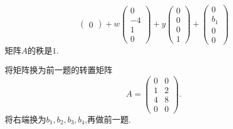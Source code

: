 ﻿\documentclass{book} \usepackage{exsheets} \usepackage{xeCJK}
\begin{document}
\begin{solution}
$$\begin{pmatrix}
  0
\end{pmatrix}+w
\begin{pmatrix}
  0\\
  -4\\
  1\\
  0
\end{pmatrix}+y
\begin{pmatrix}
  0\\
  0\\
  0\\
  1
\end{pmatrix}+
\begin{pmatrix}
  0\\
  b_1\\
  0\\
  0
\end{pmatrix}
$$矩阵$A$的秩是$1$.
\end{solution}
\begin{question}
  将矩阵换为前一题的转置矩阵
$$
A=
\begin{pmatrix}
  0&0\\
  1&2\\
  4&8\\
  0&0
\end{pmatrix}.
$$
将右端换为$b_1,b_2,b_3,b_4$,再做前一题.
\end{question}
\end{document}
